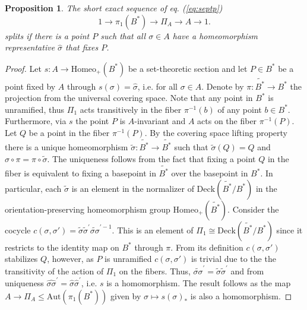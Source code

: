 \documentclass[10pt]{amsart}
\newtheorem{proposition}[theorem]{Proposition}
\theoremstyle{definition}
\begin{document}
\begin{proposition}\label{prop:ses split}
The short exact sequence of eq. (\ref{eq:septp}) 
\[
1 \rightarrow \pi_1(B^*) \rightarrow \Pi_A \rightarrow A \rightarrow 1.
\]
splits if there is a point $P$ such that all $\sigma \in A$ have a homeomorphism representative $\hat{\sigma}$ that fixes $P$. 

\end{proposition}

\begin{proof}
Let $s \colon A \rightarrow \mathrm{Homeo}_+(B^*)$ be a set-theoretic section and let $P \in B^*$ be a point fixed by $A$ through $s(\sigma) = \hat{\sigma}$, i.e. for all $\sigma \in A$. Denote by $\pi\colon  \widetilde{B^*}\rightarrow B^*$ the projection from the universal covering space. Note that any point in $B^*$ is unramified, thus $\Pi_1$ acts transitively in the fiber $\pi^{-1}(b)$ of any point $b \in B^*$. 
Furthermore, via $s$ the point $P$ is $A$-invariant and $A$ acts on the fiber $\pi^{-1}(P)$. Let $Q$ be a point in the fiber $\pi^{-1}(P)$. By the covering space lifting property \cite[13.5]{MR1343250} there is a unique homeomorphism $\tilde{\sigma}:\widetilde{B^*}\rightarrow \widetilde{B^*}$ such that $\tilde{\sigma}(Q) = Q$ and $\hat\sigma \circ \pi = \pi \circ \tilde\sigma$. The uniqueness follows from the fact that fixing a point $Q$ in the fiber is equivalent to fixing a basepoint in $\widetilde{B^*}$ over the basepoint in $B^*$. In particular, each $\tilde\sigma$ is an element in the normalizer of $\mathrm{Deck}(\widetilde{B^*}/B^*)$ in the orientation-preserving homeomorphism group $\mathrm{Homeo}_+(\widetilde{B^*})$. Consider the cocycle $c(\sigma,\sigma')=\tilde\sigma \tilde{\sigma}^\prime \widetilde{\sigma \sigma}^{\prime -1}$. This is an element of $\Pi_1 \cong \mathrm{Deck}(\widetilde{B^*}/B^*)$ since it restricts to the identity map on $B^*$ through $\pi$. From its definition $c(\sigma,\sigma')$ stabilizes $Q$, however, as $P$ is unramified $c(\sigma,\sigma')$ is trivial due to the the transitivity of the action of $\Pi_1$ on the fibers. Thus, $\widetilde{\sigma \sigma}^\prime = \tilde\sigma \tilde\sigma^\prime$ and from uniqueness $\widehat{\sigma\sigma}^\prime = \hat\sigma \hat\sigma^\prime$, i.e. $s$ is a homomorphism. The result follows as the map $A\rightarrow \Pi_A \leq \mathrm{Aut}(\pi_1(B^*))$ given by $\sigma \mapsto s(\sigma)_*$ is also a homomorphism.


\end{proof}
\end{document}
